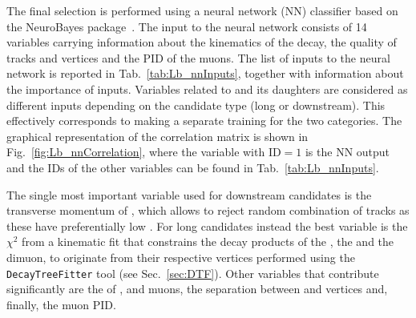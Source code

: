 The final selection is performed using a neural network (NN) classifier based on the NeuroBayes 
package~\cite{Feindt:2006pm,feindt-2004}. The input to the neural network consists of 14 variables carrying 
information about the kinematics of the decay, the quality of tracks and vertices and the PID of the muons.
The list of inputs to the neural network is reported in Tab.~\ref{tab:Lb_nnInputs}, together with information 
about the importance of inputs.
%
%
%
Variables related to \Lz and its daughters are considered as different inputs depending on the
candidate type (long or downstream). This effectively corresponds to making a separate
training for the two categories. 
The graphical representation of the correlation matrix is shown in Fig.~\ref{fig:Lb_nnCorrelation},
where the variable with ID$ = 1$ is the NN output and the IDs of the other variables can be found
in Tab.~\ref{tab:Lb_nnInputs}.

The single most important variable used for downstream candidates is the transverse momentum of
\Lz, which allows to reject random combination of tracks as these have preferentially low \pt.
For long candidates instead the best variable is the $\chi^2$ from a kinematic fit that constrains
the decay products of the \Lb, the \Lz and the dimuon, to originate from their respective vertices
performed using the \verb!DecayTreeFitter! tool (see Sec.~\ref{sec:DTF}).
Other variables that contribute significantly are the \chisqip of \Lb, \Lz and muons,
the separation between \Lb and \Lz vertices and, finally, the muon PID.

